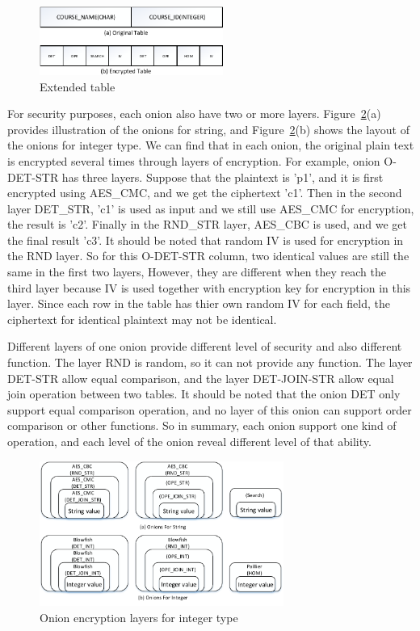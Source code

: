 \begin{figure}[tb]
\centering
\includegraphics[width=6cm]{images/extend.pdf}
\caption{Extended table}
\label{fig:stackx}
\end{figure}

For security purposes, each onion also have two or more layers. Figure~\ref{fig:stack2}(a) provides illustration of the onions for string, and Figure~\ref{fig:stack2}(b) shows the layout of the onions for integer type. We can find that in each onion, the original plain text is encrypted several times through layers of encryption. For example, onion O-DET-STR has three layers. Suppose that the plaintext is 'p1', and it is first encrypted using AES\_CMC, and we get the ciphertext 'c1'. Then in the second layer DET\_STR, 'c1' is used as input and we still use AES\_CMC for encryption, the result is 'c2'. Finally in the RND\_STR layer, AES\_CBC is used, and we get the final result 'c3'. It should be noted that random IV is used for encryption in the RND layer. So for this O-DET-STR column, two identical values are still the same in the first two layers, However, they are different when they reach the third layer because IV is used together with encryption key for encryption in this layer. Since each row in the table has thier own random IV for each field, the ciphertext for identical plaintext may not be identical. 

Different layers of one onion provide different level of security and also different function. The layer RND is random, so it can not provide any function. The layer DET-STR allow equal comparison, and the layer DET-JOIN-STR allow equal join operation between two tables. It should be noted that the onion DET only support equal comparison operation, and no layer of this onion can support order comparison or other functions. So in summary, each onion support one kind of operation, and each level of the onion reveal different level of that ability.





\begin{figure}[tb]
\centering
\includegraphics[width=8cm]{images/Onions.pdf}
\caption{Onion encryption layers for integer type}
\label{fig:stack2}
\end{figure}


